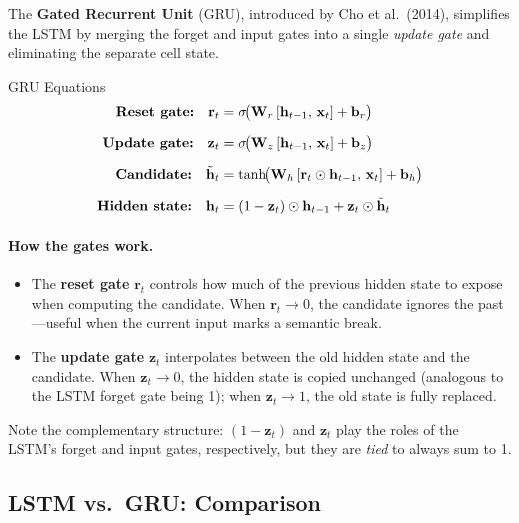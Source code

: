 The \textbf{Gated Recurrent Unit} (GRU), introduced by Cho et al.\ (2014),
simplifies the LSTM by merging the forget and input gates into a single
\emph{update gate} and eliminating the separate cell state.

\begin{mathresult}{GRU Equations}
\begin{align}
\textbf{Reset gate:} \quad
\mathbf{r}_t &= \sigma\!\bigl(\mathbf{W}_r \,[\mathbf{h}_{t-1},\, \mathbf{x}_t] + \mathbf{b}_r\bigr)
\label{eq:gru_reset} \\[6pt]
\textbf{Update gate:} \quad
\mathbf{z}_t &= \sigma\!\bigl(\mathbf{W}_z \,[\mathbf{h}_{t-1},\, \mathbf{x}_t] + \mathbf{b}_z\bigr)
\label{eq:gru_update} \\[6pt]
\textbf{Candidate:} \quad
\tilde{\mathbf{h}}_t &= \tanh\!\bigl(\mathbf{W}_h \,[\mathbf{r}_t \odot \mathbf{h}_{t-1},\, \mathbf{x}_t]
                + \mathbf{b}_h\bigr)
\label{eq:gru_candidate} \\[6pt]
\textbf{Hidden state:} \quad
\mathbf{h}_t &= (1 - \mathbf{z}_t) \odot \mathbf{h}_{t-1}
       + \mathbf{z}_t \odot \tilde{\mathbf{h}}_t
\label{eq:gru_hidden}
\end{align}
\end{mathresult}

\paragraph{How the gates work.}
\begin{itemize}[leftmargin=*]
\item The \textbf{reset gate} $\mathbf{r}_t$ controls how much of the
  previous hidden state to expose when computing the candidate.  When
  $\mathbf{r}_t \to 0$, the candidate ignores the past---useful when the
  current input marks a semantic break.

\item The \textbf{update gate} $\mathbf{z}_t$ interpolates between the old
  hidden state and the candidate.  When $\mathbf{z}_t \to 0$, the hidden
  state is copied unchanged (analogous to the LSTM forget gate being 1);
  when $\mathbf{z}_t \to 1$, the old state is fully replaced.
\end{itemize}

Note the complementary structure: $(1 - \mathbf{z}_t)$ and $\mathbf{z}_t$
play the roles of the LSTM's forget and input gates, respectively, but they
are \emph{tied} to always sum to 1.

\subsection{LSTM vs.\ GRU: Comparison}

